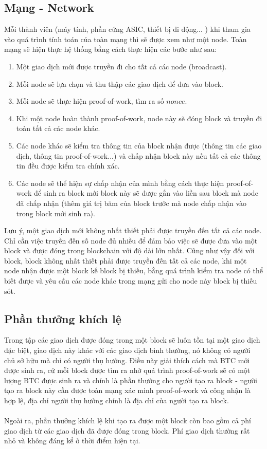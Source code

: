 \subsection{Mạng - Network}
Mỗi thành viên (máy tính, phần cứng ASIC, thiết bị di dộng... ) khi tham gia vào quá 
trình tính toán của toàn mạng thì sẽ được xem như một node. Toàn mạng sẽ hiện thực hệ 
thống bằng cách thực hiện các bước như sau:
\begin{enumerate}
\item Một giao dịch mới được truyền đi cho tất cả các node (broadcast).
\item Mỗi node sẽ lựa chọn và thu thập các giao dịch để đưa vào block.
\item Mỗi node sẽ thực hiện proof-of-work, tìm ra số $nonce$.
\item Khi một node hoàn thành proof-of-work, node này sẽ đóng block và truyền 
đi toàn tất cả các node khác.
\item Các node khác sẽ kiểm tra thông tin của block nhận được (thông tin các 
giao dịch, thông tin proof-of-work...) và chấp nhận block này nếu tất cả 
các thông tin đều được kiểm tra chính xác.
\item Các node sẽ thể hiện sự chấp nhận của mình bằng cách thực hiện proof-of-work 
để sinh ra block mới block này sẽ được gắn vào liền sau block mà node đã chấp nhận 
(thêm giá trị băm của block trước mà node chấp nhận vào trong block mới sinh ra).
\end{enumerate}
Lưu ý, một giao dịch mới không nhất thiết phải được truyền đến tất cả các node. 
Chỉ cần việc truyền đến số node đủ nhiều để đảm bảo việc sẽ được đưa vào một block 
và được đóng trong blockchain với độ dài lớn nhất. Cũng như vậy đối với block, 
block không nhất thiết phải được truyền đến tất cả các node, khi một node nhận 
được một block kế block bị thiếu, bằng quá trình kiểm tra node có thể biết được 
và yêu cầu các node khác trong mạng gửi cho node này block bị thiếu sót.
\subsection{Phần thưởng khích lệ}
Trong tập các giao dịch được đóng trong một block sẽ luôn tồn tại một giao dịch 
đặc biệt, giao dịch này khác với các giao dịch bình thường, nó không có người chủ 
sở hữu mà chỉ có người thụ hưởng. Điều này giải thích cách mà BTC mới được sinh 
ra, cứ mỗi block được tìm ra nhờ quá trình proof-of-work sẽ có một lượng BTC 
được sinh ra và chính là phần thưởng cho người tạo ra block - người tạo ra block 
này cần được toàn mạng xác minh proof-of-work và công nhận là hợp lệ, địa chỉ 
người thụ hưởng chính là địa chỉ của người tạo ra block.\\\\
Ngoài ra, phần thưởng khích lệ khi tạo ra được một block còn bao gồm cả phí giao 
dịch từ các giao dịch đã được đóng trong block. Phí giao dịch thường rất nhỏ và
không đáng kể ở thời điểm hiện tại.
